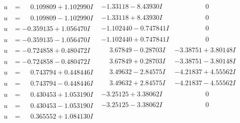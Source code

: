 \documentclass[1p]{elsarticle_modified}
\theoremstyle{definition}
\begin{document}
$$\begin{array}{c|c|c}
 \hline 
\begin{aligned}
u &= \phantom{-}0.109809 + 1.102990 I\end{aligned}
 & -1.33118 - 8.43930 I & \phantom{-0.000000 } 0 \\ \hline\begin{aligned}
u &= \phantom{-}0.109809 - 1.102990 I\end{aligned}
 & -1.33118 + 8.43930 I & \phantom{-0.000000 } 0 \\ \hline\begin{aligned}
u &= -0.359135 + 1.056470 I\end{aligned}
 & -1.102440 - 0.747841 I & \phantom{-0.000000 } 0 \\ \hline\begin{aligned}
u &= -0.359135 - 1.056470 I\end{aligned}
 & -1.102440 + 0.747841 I & \phantom{-0.000000 } 0 \\ \hline\begin{aligned}
u &= -0.724858 + 0.480472 I\end{aligned}
 & \phantom{-}3.67849 - 0.28703 I & -3.38751 + 3.80148 I \\ \hline\begin{aligned}
u &= -0.724858 - 0.480472 I\end{aligned}
 & \phantom{-}3.67849 + 0.28703 I & -3.38751 - 3.80148 I \\ \hline\begin{aligned}
u &= \phantom{-}0.743794 + 0.448446 I\end{aligned}
 & \phantom{-}3.49632 - 2.84575 I & -4.21837 + 4.55562 I \\ \hline\begin{aligned}
u &= \phantom{-}0.743794 - 0.448446 I\end{aligned}
 & \phantom{-}3.49632 + 2.84575 I & -4.21837 - 4.55562 I \\ \hline\begin{aligned}
u &= \phantom{-}0.430453 + 1.053190 I\end{aligned}
 & -3.25125 + 3.38062 I & \phantom{-0.000000 } 0 \\ \hline\begin{aligned}
u &= \phantom{-}0.430453 - 1.053190 I\end{aligned}
 & -3.25125 - 3.38062 I & \phantom{-0.000000 } 0 \\ \hline\begin{aligned}
u &= \phantom{-}0.365552 + 1.084130 I\end{aligned}

\end{array}$$
\end{document}
